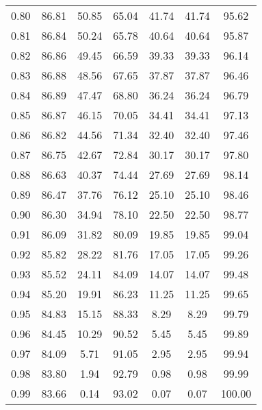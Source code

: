 \begin{tabular}{|c|c|c|c|c|c|c|}
      0.80 &     86.81 &     50.85 &      65.04 &   41.74 &      41.74 &         95.62 \\
      0.81 &     86.84 &     50.24 &      65.78 &   40.64 &      40.64 &         95.87 \\
      0.82 &     86.86 &     49.45 &      66.59 &   39.33 &      39.33 &         96.14 \\
      0.83 &     86.88 &     48.56 &      67.65 &   37.87 &      37.87 &         96.46 \\
      0.84 &     86.89 &     47.47 &      68.80 &   36.24 &      36.24 &         96.79 \\
      0.85 &     86.87 &     46.15 &      70.05 &   34.41 &      34.41 &         97.13 \\
      0.86 &     86.82 &     44.56 &      71.34 &   32.40 &      32.40 &         97.46 \\
      0.87 &     86.75 &     42.67 &      72.84 &   30.17 &      30.17 &         97.80 \\
      0.88 &     86.63 &     40.37 &      74.44 &   27.69 &      27.69 &         98.14 \\
      0.89 &     86.47 &     37.76 &      76.12 &   25.10 &      25.10 &         98.46 \\
      0.90 &     86.30 &     34.94 &      78.10 &   22.50 &      22.50 &         98.77 \\
      0.91 &     86.09 &     31.82 &      80.09 &   19.85 &      19.85 &         99.04 \\
      0.92 &     85.82 &     28.22 &      81.76 &   17.05 &      17.05 &         99.26 \\
      0.93 &     85.52 &     24.11 &      84.09 &   14.07 &      14.07 &         99.48 \\
      0.94 &     85.20 &     19.91 &      86.23 &   11.25 &      11.25 &         99.65 \\
      0.95 &     84.83 &     15.15 &      88.33 &    8.29 &       8.29 &         99.79 \\
      0.96 &     84.45 &     10.29 &      90.52 &    5.45 &       5.45 &         99.89 \\
      0.97 &     84.09 &      5.71 &      91.05 &    2.95 &       2.95 &         99.94 \\
      0.98 &     83.80 &      1.94 &      92.79 &    0.98 &       0.98 &         99.99 \\
      0.99 &     83.66 &      0.14 &      93.02 &    0.07 &       0.07 &        100.00 \\
\bottomrule
\end{tabular}
